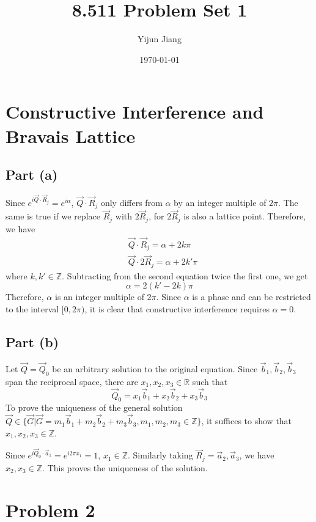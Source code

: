 \documentclass{article}
\title{8.511 Problem Set 1}
\author{Yijun Jiang}
\date{\today}
\begin{document}
\maketitle
\section{Constructive Interference and Bravais Lattice}
\subsection{Part (a)}
Since $e^{i\vec{Q}\cdot\vec{R}_j}=e^{i\alpha}$, $\vec{Q}\cdot\vec{R}_j$ only differs from $\alpha$ by an integer multiple of $2\pi$. The same is true if we replace $\vec{R}_j$ with $2\vec{R}_j$, for $2\vec{R}_j$ is also a lattice point. Therefore, we have
\begin{align*}
	&\vec{Q}\cdot\vec{R}_j=\alpha+2k\pi\\
	&\vec{Q}\cdot2\vec{R}_j=\alpha+2k'\pi
\end{align*}
where $k,k'\in\mathbb{Z}$. Subtracting from the second equation twice the first one, we get
\begin{equation*}
	\alpha=2(k'-2k)\pi
\end{equation*}
Therefore, $\alpha$ is an integer multiple of $2\pi$. Since $\alpha$ is a phase and can be restricted to the interval $[0,2\pi)$, it is clear that constructive interference requires $\alpha=0$.

\subsection{Part (b)}
Let $\vec{Q}=\vec{Q}_0$ be an arbitrary solution to the original equation. Since $\vec{b}_1,\vec{b}_2,\vec{b}_3$ span the reciprocal space, there are $x_1,x_2,x_3\in\mathbb{R}$ such that
\begin{equation*}
	\vec{Q}_0=x_1\vec{b}_1+x_2\vec{b}_2+x_3\vec{b}_3
\end{equation*}
To prove the uniqueness of the general solution $\vec{Q}\in\{\vec{G}|\vec{G}=m_1\vec{b}_1+m_2\vec{b}_2+m_3\vec{b}_3,m_1,m_2,m_3\in\mathbb{Z}\}$, it suffices to show that $x_1,x_2,x_3\in\mathbb{Z}$.

Since $e^{i\vec{Q}_0\cdot\vec{a}_1}=e^{i2\pi x_1}=1$, $x_1\in\mathbb{Z}$. Similarly taking $\vec{R}_j=\vec{a}_2,\vec{a}_3$, we have $x_2,x_3\in\mathbb{Z}$. This proves the uniqueness of the solution.

\section{Problem 2}
\end{document}
